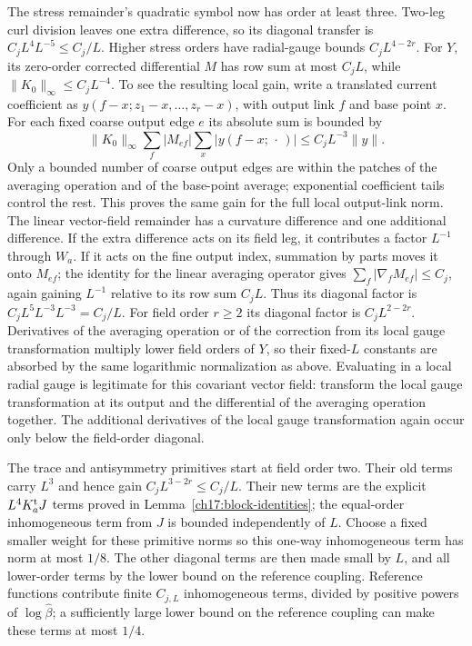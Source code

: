 The stress remainder's quadratic symbol now has order at least three.
Two-leg curl division leaves one extra difference, so its diagonal
transfer is $C_jL^4L^{-5}\le C_j/L$. Higher stress orders have
radial-gauge bounds $C_jL^{4-2r}$.
For $Y$, its zero-order corrected differential $M$ has row sum at most
$C_jL$, while $\|K_0\|_\infty\le C_jL^{-4}$.
To see the resulting local gain, write a translated current coefficient
as $y(f-x;z_1-x,\ldots,z_r-x)$, with output link $f$ and base point $x$.
For each fixed coarse output edge $e$ its absolute sum is bounded by
\[
 \|K_0\|_\infty\sum_f|M_{ef}|
        \sum_x|y(f-x;\,\cdot\,)|
                   \le C_jL^{-3}\|y\|.
\]
Only a bounded number of coarse output edges are within the patches of the averaging
operation and of the base-point average; exponential coefficient tails control the rest.
This proves the same gain for the full local output-link norm.
The linear vector-field remainder has a curvature difference and one
additional difference. If the extra difference acts on its field leg,
it contributes a factor $L^{-1}$ through $W_a$. If it acts on the fine output index,
summation by parts moves it onto $M_{ef}$; the identity for the linear averaging operator gives
$\sum_f|\nabla_fM_{ef}|\le C_j$, again gaining $L^{-1}$ relative to
its row sum $C_jL$. Thus its diagonal factor is
$C_jL^5L^{-3}L^{-3}=C_j/L$.
For field order $r\ge2$ its diagonal factor is $C_jL^{2-2r}$.
Derivatives of the averaging operation or of the correction from its local gauge transformation multiply lower
field orders of $Y$, so their fixed-$L$ constants are absorbed by the
same logarithmic normalization as above. Evaluating in a local radial
gauge is legitimate for this covariant vector field: transform the local gauge
transformation at its output and the differential of the averaging operation together. The additional
derivatives of the local gauge transformation again occur only below the field-order diagonal.

The trace and antisymmetry primitives start at field order two. Their
old terms carry $L^3$ and hence gain $C_jL^{3-2r}\le C_j/L$.
Their new terms are the explicit $L^4K_a^{\rm t}J$ terms proved in
Lemma~\ref{ch17:block-identities}; the equal-order inhomogeneous term from $J$
is bounded independently of $L$. Choose a fixed smaller weight for
these primitive norms so this one-way inhomogeneous term has norm at most $1/8$.
The other diagonal terms are then made small by $L$, and all lower-order
terms by the lower bound on the reference coupling. Reference functions contribute finite
$C_{j,L}$ inhomogeneous terms, divided by positive powers of $\log\widehat\beta$;
a sufficiently large lower bound on the reference coupling can make these terms at most $1/4$.

